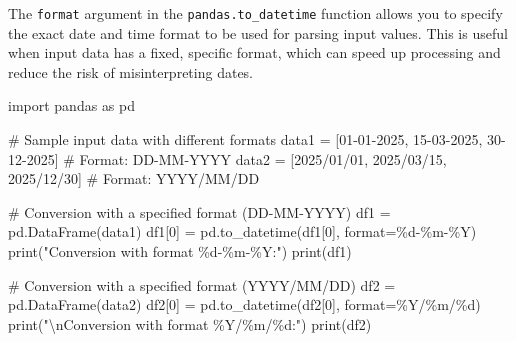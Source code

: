 \documentclass[
  english,
  letterpaper,
  DIV=11,
  numbers=noendperiod]{scrreprt}
\newenvironment{Shaded}{\begin{snugshade}}{\end{snugshade}}
\newcommand{\BuiltInTok}[1]{\textcolor[rgb]{0.00,0.23,0.31}{#1}}
\newcommand{\CharTok}[1]{\textcolor[rgb]{0.13,0.47,0.30}{#1}}
\newcommand{\CommentTok}[1]{\textcolor[rgb]{0.37,0.37,0.37}{#1}}
\newcommand{\DecValTok}[1]{\textcolor[rgb]{0.68,0.00,0.00}{#1}}
\newcommand{\ImportTok}[1]{\textcolor[rgb]{0.00,0.46,0.62}{#1}}
\newcommand{\NormalTok}[1]{\textcolor[rgb]{0.00,0.23,0.31}{#1}}
\newcommand{\OperatorTok}[1]{\textcolor[rgb]{0.37,0.37,0.37}{#1}}
\newcommand{\SpecialCharTok}[1]{\textcolor[rgb]{0.37,0.37,0.37}{#1}}
\newcommand{\StringTok}[1]{\textcolor[rgb]{0.13,0.47,0.30}{#1}}
\begin{document}
The \texttt{format} argument in the \texttt{pandas.to\_datetime}
function allows you to specify the exact date and time format to be used
for parsing input values. This is useful when input data has a fixed,
specific format, which can speed up processing and reduce the risk of
misinterpreting dates.

\begin{Shaded}
\begin{Highlighting}[]
\ImportTok{import}\NormalTok{ pandas }\ImportTok{as}\NormalTok{ pd}

\CommentTok{\# Sample input data with different formats}
\NormalTok{data1 }\OperatorTok{=}\NormalTok{ [}\StringTok{\textquotesingle{}01{-}01{-}2025\textquotesingle{}}\NormalTok{, }\StringTok{\textquotesingle{}15{-}03{-}2025\textquotesingle{}}\NormalTok{, }\StringTok{\textquotesingle{}30{-}12{-}2025\textquotesingle{}}\NormalTok{]  }\CommentTok{\# Format: DD{-}MM{-}YYYY}
\NormalTok{data2 }\OperatorTok{=}\NormalTok{ [}\StringTok{\textquotesingle{}2025/01/01\textquotesingle{}}\NormalTok{, }\StringTok{\textquotesingle{}2025/03/15\textquotesingle{}}\NormalTok{, }\StringTok{\textquotesingle{}2025/12/30\textquotesingle{}}\NormalTok{]  }\CommentTok{\# Format: YYYY/MM/DD}

\CommentTok{\# Conversion with a specified format (DD{-}MM{-}YYYY)}
\NormalTok{df1 }\OperatorTok{=}\NormalTok{ pd.DataFrame(data1)}
\NormalTok{df1[}\DecValTok{0}\NormalTok{] }\OperatorTok{=}\NormalTok{ pd.to\_datetime(df1[}\DecValTok{0}\NormalTok{], }\BuiltInTok{format}\OperatorTok{=}\StringTok{\textquotesingle{}}\SpecialCharTok{\%d}\StringTok{{-}\%m{-}\%Y\textquotesingle{}}\NormalTok{)}
\BuiltInTok{print}\NormalTok{(}\StringTok{"Conversion with format \textquotesingle{}}\SpecialCharTok{\%d}\StringTok{{-}\%m{-}\%Y\textquotesingle{}:"}\NormalTok{)}
\BuiltInTok{print}\NormalTok{(df1)}

\CommentTok{\# Conversion with a specified format (YYYY/MM/DD)}
\NormalTok{df2 }\OperatorTok{=}\NormalTok{ pd.DataFrame(data2)}
\NormalTok{df2[}\DecValTok{0}\NormalTok{] }\OperatorTok{=}\NormalTok{ pd.to\_datetime(df2[}\DecValTok{0}\NormalTok{], }\BuiltInTok{format}\OperatorTok{=}\StringTok{\textquotesingle{}\%Y/\%m/}\SpecialCharTok{\%d}\StringTok{\textquotesingle{}}\NormalTok{)}
\BuiltInTok{print}\NormalTok{(}\StringTok{"}\CharTok{\textbackslash{}n}\StringTok{Conversion with format \textquotesingle{}\%Y/\%m/}\SpecialCharTok{\%d}\StringTok{\textquotesingle{}:"}\NormalTok{)}
\BuiltInTok{print}\NormalTok{(df2)}
\end{Highlighting}
\end{Shaded}
\end{document}
